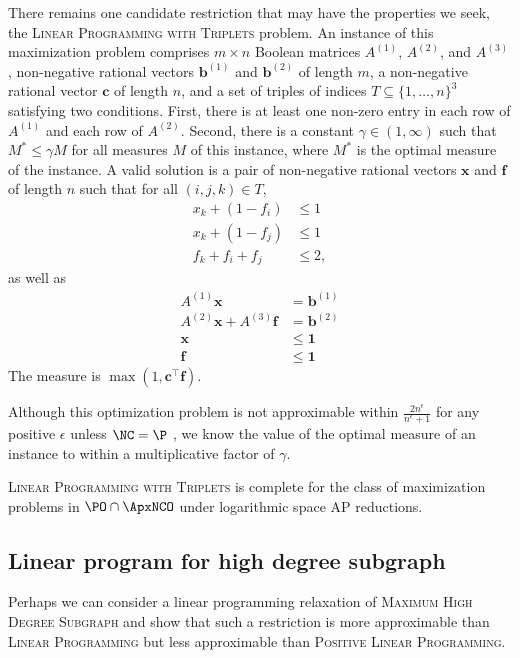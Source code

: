 There remains one candidate restriction that may have the properties we seek, the \textsc{Linear Programming with Triplets} problem.
An instance of this maximization problem comprises $m \times n$ Boolean matrices $A^{(1)}$, $A^{(2)}$, and $A^{(3)}$, non-negative rational vectors $\mathbf{b}^{(1)}$ and $\mathbf{b}^{(2)}$ of length $m$, a non-negative rational vector $\mathbf{c}$ of length $n$, and a set of triples of indices $T \subseteq \{1, \dotsc, n\}^3$ satisfying two conditions.
First, there is at least one non-zero entry in each row of $A^{(1)}$ and each row of $A^{(2)}$.
Second, there is a constant $\gamma \in (1, \infty)$ such that $M^* \leq \gamma M$ for all measures $M$ of this instance, where $M^*$ is the optimal measure of the instance.
A valid solution is a pair of non-negative rational vectors $\mathbf{x}$ and $\mathbf{f}$ of length $n$ such that for all $(i, j, k) \in T$,
\begin{align*}
  x_k + (1 - f_i) & \leq 1 \\
  x_k + (1 - f_j) & \leq 1 \\
  f_k + f_i + f_j & \leq 2,
\end{align*}
as well as
\begin{align*}
  A^{(1)} \mathbf{x} & = \mathbf{b}^{(1)} \\
  A^{(2)} \mathbf{x} + A^{(3)} \mathbf{f} & = \mathbf{b}^{(2)} \\[0.5em]
  \mathbf{x} & \leq \mathbf{1} \\
  \mathbf{f} & \leq \mathbf{1}
\end{align*}
The measure is $\max(1, \mathbf{c}^\intercal \mathbf{f})$.

Although this optimization problem is not approximable within $\frac{2 n^\epsilon}{n^\epsilon + 1}$ for any positive $\epsilon$ unless $\NC = \P$ \cite[Corollary~1]{sx02}, we know the value of the optimal measure of an instance to within a multiplicative factor of $\gamma$.

\begin{conjecture}
  \textsc{Linear Programming with Triplets} is complete for the class of maximization problems in $\PO \cap \ApxNCO$ under logarithmic space AP reductions.
\end{conjecture}

\subsection{Linear program for high degree subgraph}

Perhaps we can consider a linear programming relaxation of \textsc{Maximum High Degree Subgraph} and show that such a restriction is more approximable than \textsc{Linear Programming} but less approximable than \textsc{Positive Linear Programming}.

